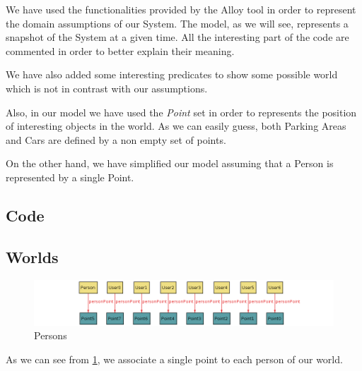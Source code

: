 We have used the functionalities provided by the Alloy tool in order to represent the domain assumptions of our System. 
The model, as we will see, represents a snapshot of the System at a given time.
All the interesting part of the code are commented in order to better explain their meaning.

We have also added some interesting predicates to show some possible world which is not in contrast with our assumptions.

Also, in our model we have used the \textit{Point} set in order to represents the position of interesting objects in the world. As we can easily guess, both Parking Areas and Cars are defined by a non empty set of points.

On the other hand, we have simplified our model assuming that a Person is represented by a single Point.


\subsection{Code}





\subsection{Worlds}

\begin{figure}[!htbp]
\centering
\includegraphics[width=\linewidth,keepaspectratio]{../Alloy/Exported/Images/Persons.png}
\caption{Persons}
\label{fig:Persons}
\end{figure}
As we can see from \ref{fig:Persons}, we associate a single point to each person of our world.

